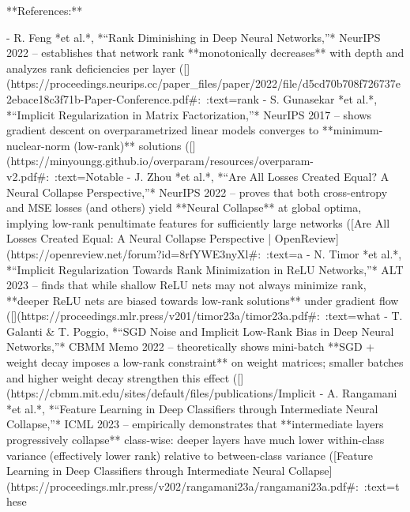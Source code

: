 **References:**

- R. Feng *et al.*, *“Rank Diminishing in Deep Neural Networks,”* NeurIPS 2022 – establishes that network rank **monotonically decreases** with depth and analyzes rank deficiencies per layer ([](https://proceedings.neurips.cc/paper_files/paper/2022/file/d5cd70b708f726737e2ebace18c3f71b-Paper-Conference.pdf#:~:text=rank%
- S. Gunasekar *et al.*, *“Implicit Regularization in Matrix Factorization,”* NeurIPS 2017 – shows gradient descent on overparametrized linear models converges to **minimum-nuclear-norm (low-rank)** solutions ([](https://minyoungg.github.io/overparam/resources/overparam-v2.pdf#:~:text=Notable%
- J. Zhou *et al.*, *“Are All Losses Created Equal? A Neural Collapse Perspective,”* NeurIPS 2022 – proves that both cross-entropy and MSE losses (and others) yield **Neural Collapse** at global optima, implying low-rank penultimate features for sufficiently large networks ([Are All Losses Created Equal: A Neural Collapse Perspective | OpenReview](https://openreview.net/forum?id=8rfYWE3nyXl#:~:text=a%
- N. Timor *et al.*, *“Implicit Regularization Towards Rank Minimization in ReLU Networks,”* ALT 2023 – finds that while shallow ReLU nets may not always minimize rank, **deeper ReLU nets are biased towards low-rank solutions** under gradient flow ([](https://proceedings.mlr.press/v201/timor23a/timor23a.pdf#:~:text=what%
- T. Galanti & T. Poggio, *“SGD Noise and Implicit Low-Rank Bias in Deep Neural Networks,”* CBMM Memo 2022 – theoretically shows mini-batch **SGD + weight decay imposes a low-rank constraint** on weight matrices; smaller batches and higher weight decay strengthen this effect ([](https://cbmm.mit.edu/sites/default/files/publications/Implicit%
- A. Rangamani *et al.*, *“Feature Learning in Deep Classifiers through Intermediate Neural Collapse,”* ICML 2023 – empirically demonstrates that **intermediate layers progressively collapse** class-wise: deeper layers have much lower within-class variance (effectively lower rank) relative to between-class variance ([Feature Learning in Deep Classifiers through Intermediate Neural Collapse](https://proceedings.mlr.press/v202/rangamani23a/rangamani23a.pdf#:~:text=these%

